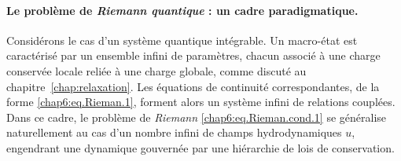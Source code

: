\paragraph*{Le problème de \emph{Riemann quantique} : un cadre paradigmatique.}
Considérons le cas d’un système quantique intégrable.  
Un macro-état est caractérisé par un ensemble infini de paramètres, chacun associé à une charge conservée locale reliée à une charge globale, comme discuté au chapitre~\ref{chap:relaxation}.  
Les équations de continuité correspondantes, de la forme \eqref{chap6:eq.Rieman.1}, forment alors un système infini de relations couplées.  
Dans ce cadre, le problème de \emph{Riemann} \eqref{chap6:eq.Rieman.cond.1} se généralise naturellement au cas d’un nombre infini de champs hydrodynamiques $u$, engendrant une dynamique gouvernée par une hiérarchie de lois de conservation.



